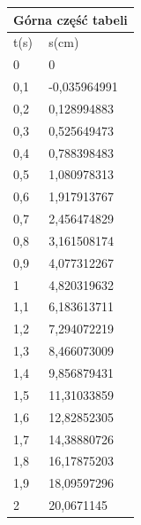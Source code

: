 \documentclass{article}
\begin{document}
\begin{tabular}{|p{4cm}|p{4cm}|}
\hline
\multicolumn{2}{|c|}{Górna część tabeli}\\ \hline
t(s) & s(cm)\\ \hline
0 &	0 \\ \hline
0,1	& -0,035964991\\ \hline
0,2 & 0,128994883\\ \hline
0,3 & 0,525649473\\ \hline
0,4 &	0,788398483\\ \hline
0,5 & 1,080978313 \\ \hline
0,6	& 1,917913767\\ \hline
0,7 &	2,456474829 \\ \hline
0,8 &	3,161508174\\ \hline
0,9 &	4,077312267\\ \hline
1 &	4,820319632\\ \hline
1,1 &	6,183613711\\ \hline
1,2 &	7,294072219\\ \hline
1,3 &	8,466073009\\ \hline
1,4 &	9,856879431\\ \hline
1,5 &	11,31033859\\ \hline
1,6 &	12,82852305\\ \hline
1,7 &	14,38880726\\ \hline
1,8	&   16,17875203\\ \hline
1,9	&   18,09597296\\ \hline
2 & 	20,0671145\\ \hline
\end{tabular}
\quad
\end{document}
